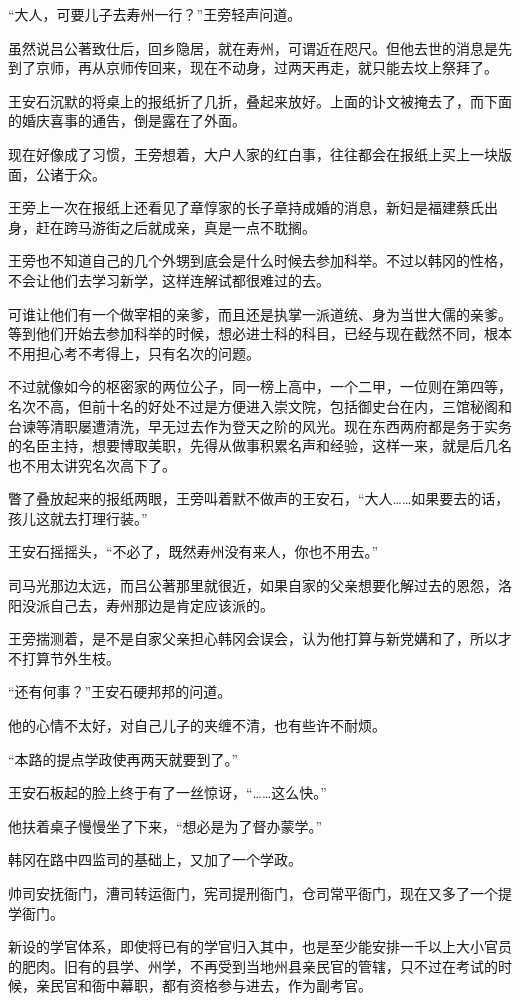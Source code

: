 “大人，可要儿子去寿州一行？”王旁轻声问道。

虽然说吕公著致仕后，回乡隐居，就在寿州，可谓近在咫尺。但他去世的消息是先到了京师，再从京师传回来，现在不动身，过两天再走，就只能去坟上祭拜了。

王安石沉默的将桌上的报纸折了几折，叠起来放好。上面的讣文被掩去了，而下面的婚庆喜事的通告，倒是露在了外面。

现在好像成了习惯，王旁想着，大户人家的红白事，往往都会在报纸上买上一块版面，公诸于众。

王旁上一次在报纸上还看见了章惇家的长子章持成婚的消息，新妇是福建蔡氏出身，赶在跨马游街之后就成亲，真是一点不耽搁。

王旁也不知道自己的几个外甥到底会是什么时候去参加科举。不过以韩冈的性格，不会让他们去学习新学，这样连解试都很难过的去。

可谁让他们有一个做宰相的亲爹，而且还是执掌一派道统、身为当世大儒的亲爹。等到他们开始去参加科举的时候，想必进士科的科目，已经与现在截然不同，根本不用担心考不考得上，只有名次的问题。

不过就像如今的枢密家的两位公子，同一榜上高中，一个二甲，一位则在第四等，名次不高，但前十名的好处不过是方便进入崇文院，包括御史台在内，三馆秘阁和台谏等清职屡遭清洗，早无过去作为登天之阶的风光。现在东西两府都是务于实务的名臣主持，想要博取美职，先得从做事积累名声和经验，这样一来，就是后几名也不用太讲究名次高下了。

瞥了叠放起来的报纸两眼，王旁叫着默不做声的王安石，“大人……如果要去的话，孩儿这就去打理行装。”

王安石摇摇头，“不必了，既然寿州没有来人，你也不用去。”

司马光那边太远，而吕公著那里就很近，如果自家的父亲想要化解过去的恩怨，洛阳没派自己去，寿州那边是肯定应该派的。

王旁揣测着，是不是自家父亲担心韩冈会误会，认为他打算与新党媾和了，所以才不打算节外生枝。

“还有何事？”王安石硬邦邦的问道。

他的心情不太好，对自己儿子的夹缠不清，也有些许不耐烦。

“本路的提点学政使再两天就要到了。”

王安石板起的脸上终于有了一丝惊讶，“……这么快。”

他扶着桌子慢慢坐了下来，“想必是为了督办蒙学。”

韩冈在路中四监司的基础上，又加了一个学政。

帅司安抚衙门，漕司转运衙门，宪司提刑衙门，仓司常平衙门，现在又多了一个提学衙门。

新设的学官体系，即使将已有的学官归入其中，也是至少能安排一千以上大小官员的肥肉。旧有的县学、州学，不再受到当地州县亲民官的管辖，只不过在考试的时候，亲民官和衙中幕职，都有资格参与进去，作为副考官。

